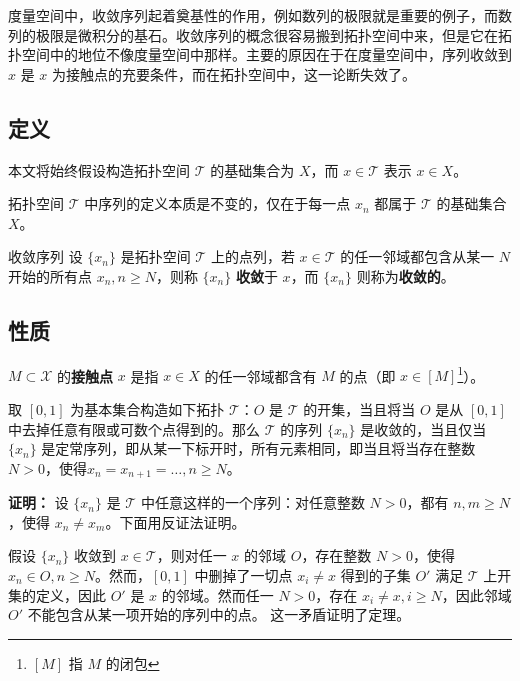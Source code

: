 

\cite{Ke1}度量空间中，收敛序列起着奠基性的作用，例如数列的极限就是重要的例子，而数列的极限是微积分的基石。收敛序列的概念很容易搬到拓扑空间中来，但是它在拓扑空间中的地位不像度量空间中那样。主要的原因在于在度量空间中，序列收敛到 $x$ 是 $x$ 为接触点的充要条件，而在拓扑空间中，这一论断失效了。

\subsection{定义}
本文将始终假设构造拓扑空间 $\mathcal T$ 的基础集合为 $X$，而 $x\in\mathcal T$ 表示 $x\in X$。

拓扑空间 $\mathcal T$ 中序列的定义本质是不变的，仅在于每一点 $x_n$ 都属于 $\mathcal T$ 的基础集合 $X$。
\begin{definition}{收敛序列}
设 $\{x_n\}$ 是拓扑空间 $\mathcal T$ 上的点列，若 $x\in\mathcal T$ 的任一邻域都包含从某一 $N$ 开始的所有点 $x_n,n\geq N$，则称 $\{x_n\}$ \textbf{收敛}于 $x$，而 $\{x_n\}$ 则称为\textbf{收敛的}。
\end{definition}
\subsection{性质}
 $M\subset\mathcal X$ 的\textbf{接触点} $x$ 是指 $x\in X$ 的任一邻域都含有 $M$ 的点（即 $x\in[M]$\footnote{$[M]$ 指 $M$ 的闭包}）。
 
 \begin{lemma}{}\label{lem_ConvTp_1}
 取 $[0,1]$ 为基本集合构造如下拓扑 $\mathcal T$：$O$ 是 $\mathcal T$ 的开集，当且将当 $O$ 是从 $[0,1]$ 中去掉任意有限或可数个点得到的。那么 $\mathcal T$ 的序列 $\{x_n\}$ 是收敛的，当且仅当 $\{x_n\}$ 是定常序列，即从某一下标开时，所有元素相同，即当且将当存在整数 $N>0$，使得$x_n=x_{n+1}=\ldots,n\geq N$。
 \end{lemma}
 \textbf{证明：}
设 $\{x_n\}$ 是 $\mathcal T$ 中任意这样的一个序列：对任意整数 $N>0$，都有 $n,m\geq N$，使得 $x_n\neq x_m$。下面用反证法证明。 

假设 $\{x_n\}$ 收敛到 $x\in\mathcal T$，则对任一 $x$ 的邻域 $O$，存在整数 $N>0$，使得 $x_n\in O,n\geq N$。然而，$[0,1]$ 中删掉了一切点 $x_i\neq x$ 得到的子集 $O'$ 满足 $\mathcal T$ 上开集的定义，因此 $O'$ 是 $x$ 的邻域。然而任一 $N>0$，存在 $x_i\neq x,i\geq N$，因此邻域 $O'$ 不能包含从某一项开始的序列中的点。  这一矛盾证明了定理。

